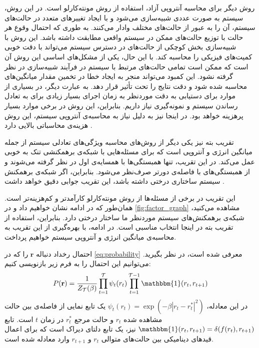 روش دیگر برای محاسبه آنتروپی آزاد، استفاده از روش مونته‌کارلو است.
در این روش، سیستم به صورت عددی شبیه‌سازی می‌شود و با ایجاد تغییر‌های متعدد در حالت‌های سیستم، آن را به عبور از حالت‌های مختلف وادار می‌کنند.
به طوری که احتمال وقوع هر حالت با توزیع حالت‌های ممکن در سیستم واقعی مطابقت داشته باشد.
این روش با شبیه‌سازی بخش کوچکی از حالت‌های در دسترس سیستم می‌تواند با دقت خوبی کمیت‌های فیزیکی را محاسبه کند.
با این حال، یکی از مشکل‌های اساسی این روش آن است که ممکن است تمامی حالت‌های مرتبط با سیستم در فرآیند شبیه‌سازی در نظر گرفته نشود.
این کمبود می‌تواند منجر به ایجاد خطا در تخمین مقدار میانگین‌های محاسبه شده شود و دقت نتایج را تحت تأثیر قرار دهد.
به عبارت دیگر، در بسیاری از موارد برای دستیابی به دقت موردنظر به زمان اجرای بسیار زیادی برای به تعادل رساندن سیستم و نمونه‌گیری نیاز داریم.
بنابراین، این روش در برخی موارد بسیار پرهزینه خواهد بود.
در اینجا نیز به دلیل نیاز به محاسبه‌ی آنتروپی سیستم، این روش هزینه‌ی محاسباتی بالایی دارد
\cite{newman1999,landau2021}.

تقریب بته نیز یکی دیگر از روش‌های محاسبه ویژگی‌های تعادلی سیستم از جمله میانگین انرژی و آنتروپی است که برای مسئله‌هایی با شبکه‌ی برهمکنشی تنک به خوبی عمل می‌کند.
در این تقریب، تنها همبستگی‌ها با همسایه‌ی اول در نظر گرفته می‌شوند و از همبستگی‌های با فاصله‌ی دورتر صرف‌نظر می‌شود.
بنابراین، اگر شبکه‌ی برهمکنش سیستم ساختاری درختی داشته باشد، این تقریب جوابی دقیق خواهد داشت
\cite{mezard2009}.

این تقریب در برخی از مسئله‌ها از روش مونته‌کارلو کارآمدتر و کم‌هزینه‌تر است.
همان‌طور که در ادامه نشان خواهیم داد و در
\autoref{fig:factor_graph}
مشاهده می‌کنید، شبکه‌ی برهمکنش‌های سیستم موردنظر ما ساختار درختی دارد.
بنابراین، استفاده از تقریب بته در اینجا انتخاب مناسبی است.
در ادامه، با بهره‌گیری از این تقریب به محاسبه‌ی میانگین انرژی و آنتروپی
سیستم خواهیم پرداخت.

احتمال رخداد دنباله
\( \mathbf{r} \)
را که در
\autoref{eq:probability}
معرفی شده است،
در نظر بگیرید.
می‌توانیم این احتمال را به فرم زیر بازنویسی کنیم:
\begin{equation} \label{eq:probability_product}
    P(\mathbf{r}) = \frac{1}{Z_{\mathcal{T}}(\beta)} \prod_{t=1}^{\mathcal{T}} \psi_{t}(r_{t}) \prod_{t=1}^{\mathcal{T}-1} \mathbbm{1}(r_{t}, r_{t+1})
\end{equation}
در این معادله،
\( \psi_{t}(r_{t}) = \exp \left( {-\beta |r_{t} - r^{*}_{t}|^{2}} \right) \)
یک تابع نمایی از فاصله‌ی بین حالت مشاهده شده
\( r_{t} \)
و حالت مرجع
\( r^{*}_{t} \)
در زمان
\( t \)
است.
تابع
\( \mathbbm{1}(r_{t}, r_{t+1}) = \delta(f(r_{t}), r_{t+1}) \)
نیز، یک تابع دلتای دیراک است که برای اعمال قیدهای دینامیکی بین حالت‌های متوالی
\( r_{t} \) و \( r_{t+1} \)
وارد معادله شده است.

